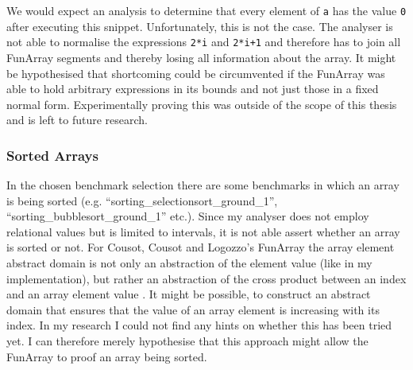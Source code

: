 \noindent We would expect an analysis to determine that every element of \texttt{a} has the value \texttt{0} after executing this snippet. Unfortunately, this is not the case. The analyser is not able to normalise the expressions \texttt{2*i} and \texttt{2*i+1} and therefore has to join all FunArray segments and thereby losing all information about the array.
 It might be hypothesised that shortcoming could be circumvented if the FunArray was able to hold arbitrary expressions in its bounds and not just those in a fixed normal form. Experimentally proving this was outside of the scope of this thesis and is left to future research.
 

\subsubsection{Sorted Arrays}

In the chosen benchmark selection there are some benchmarks in which an array is being sorted (e.g. ``sorting\_selectionsort\_ground\_1'', ``sorting\_bubblesort\_\allowbreak{}ground\_1'' etc.). Since my analyser does not employ relational values but is limited to intervals, it is not able assert whether an array is sorted or not. 
 For Cousot, Cousot and Logozzo's FunArray the array element abstract domain is not only an abstraction of the element value (like in my implementation), but rather an abstraction of the cross product between an index and an array element value \cite{cousot2011}. It might be possible, to construct an abstract domain that ensures that the value of an array element is increasing with its index. In my research I could not find any hints on whether this has been tried yet. I can therefore merely hypothesise that this approach might allow the FunArray to proof an array being sorted. 
 
 
 
 
 
 
 
 
 
 
 
 

